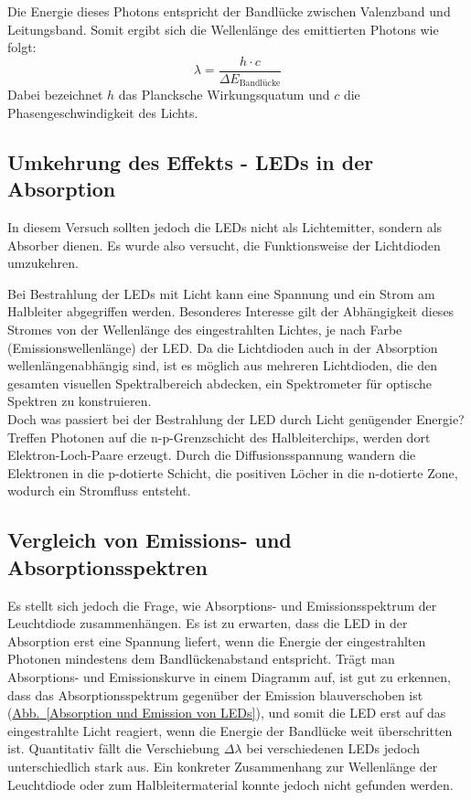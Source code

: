 \documentclass[11pt]{scrartcl}
\newcommand{\hypref}[2]{\hyperref[#2]{{#1}~\ref{#2}}}
\begin{document}
Die Energie dieses Photons entspricht der Bandlücke zwischen Valenzband und Leitungsband. Somit ergibt sich die Wellenlänge des emittierten Photons wie folgt:
 \[ \lambda = \frac{h \cdot c}{\Delta E_{\text{Bandlücke}}} \]
Dabei bezeichnet $h$ das Plancksche Wirkungsquatum und $c$ die Phasengeschwindigkeit des Lichts.

\subsection{Umkehrung des Effekts - LEDs in der Absorption}
In diesem Versuch sollten jedoch die LEDs nicht als Lichtemitter, sondern als Absorber dienen. Es wurde also versucht, die Funktionsweise der Lichtdioden umzukehren.

Bei Bestrahlung der LEDs mit Licht kann eine Spannung und ein Strom am Halbleiter abgegriffen werden. Besonderes Interesse gilt der Abhängigkeit dieses Stromes von der Wellenlänge des eingestrahlten Lichtes, je nach Farbe (Emissionswellenlänge) der LED. Da die Lichtdioden auch in der Absorption wellenlängenabhängig sind, ist es möglich aus mehreren Lichtdioden, die den gesamten visuellen Spektralbereich abdecken, ein Spektrometer für optische Spektren zu konstruieren.\\
Doch was passiert bei der Bestrahlung der LED durch Licht genügender Energie? Treffen Photonen auf die n-p-Grenzschicht des Halbleiterchips, werden dort Elektron-Loch-Paare erzeugt. Durch die Diffusionsspannung wandern die Elektronen in die p-dotierte Schicht, die positiven Löcher in die n-dotierte Zone, wodurch ein Stromfluss entsteht.

\subsection{Vergleich von Emissions- und Absorptionsspektren}
Es stellt sich jedoch die Frage, wie Absorptions- und Emissionsspektrum der Leuchtdiode zusammenh\"angen.
Es ist zu erwarten, dass die LED in der Absorption erst eine Spannung liefert, wenn die Energie der eingestrahlten Photonen mindestens dem Bandlückenabstand entspricht.
Tr\"agt man Absorptions- und Emissionskurve in einem Diagramm auf, ist gut zu erkennen, dass das Absorptionsspektrum gegen\"uber der Emission blauverschoben ist (\hypref{Abb.}{Absorption und Emission von LEDs}), und somit die LED erst auf das eingestrahlte Licht reagiert, wenn die Energie der Bandlücke weit überschritten ist. Quantitativ fällt die Verschiebung $\Delta \lambda$ bei verschiedenen LEDs jedoch unterschiedlich stark aus.
Ein konkreter Zusammenhang zur Wellenlänge der Leuchtdiode oder zum Halbleitermaterial konnte jedoch nicht gefunden werden.
\end{document}
